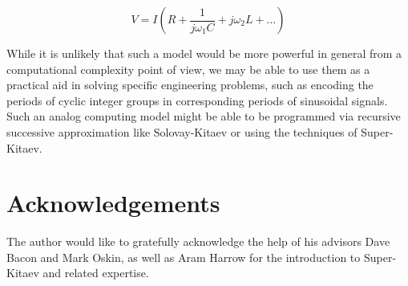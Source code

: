 \begin{displaymath}
V = I(R + \frac{1}{j\omega_1 C} + j\omega_2 L + \ldots)
\end{displaymath}

While it is unlikely that such a model would be more powerful in general
from a computational complexity point of view, we may be able to use them
as a practical aid in solving specific engineering problems, such as
encoding the periods of cyclic integer groups in corresponding periods of
sinusoidal signals. Such an analog computing model might be able to be
programmed via recursive successive approximation like Solovay-Kitaev or
using the techniques of Super-Kitaev.

\section{Acknowledgements}

The author would like to gratefully acknowledge the help of
his advisors Dave Bacon and Mark Oskin,
as well as Aram Harrow for the introduction to
Super-Kitaev and related expertise.